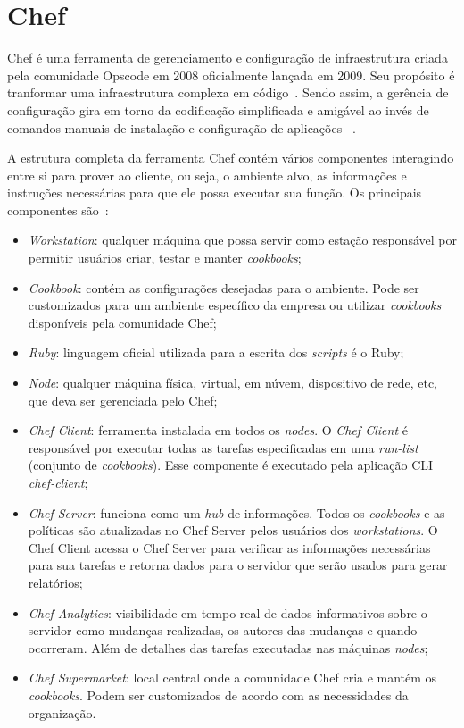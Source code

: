 \section{Chef}
\label{sec:chef}

Chef é uma ferramenta de gerenciamento e configuração de infraestrutura criada
pela comunidade Opscode em 2008 oficialmente lançada em 2009. Seu propósito é
tranformar uma infraestrutura complexa em código~\cite{chef:2016}. Sendo assim, a gerência de
configuração gira em torno da codificação simplificada e amigável
ao invés de comandos manuais de instalação e configuração de aplicações ~\cite{sharma:2015}.

A estrutura completa da ferramenta Chef contém vários componentes interagindo entre si para
prover ao cliente, ou seja, o ambiente alvo, as informações e instruções necessárias para que ele
possa executar sua função. Os principais componentes são~\cite{chefdoc:2016}:

\begin{itemize}
  \item \textit{Workstation}: qualquer máquina que possa servir como estação
    responsável por permitir usuários criar, testar e manter \textit{cookbooks};
  \item \textit{Cookbook}: contém as configurações desejadas para o ambiente.
    Pode ser customizados para um ambiente específico da empresa ou utilizar
    \textit{cookbooks} disponíveis pela comunidade Chef;
  \item \textit{Ruby}: linguagem oficial utilizada para a escrita dos \textit{scripts}
    é o Ruby;
  \item \textit{Node}: qualquer máquina física, virtual, em núvem, dispositivo
    de rede, etc, que deva ser gerenciada pelo Chef;
  \item \textit{Chef Client}: ferramenta instalada em todos os \textit{nodes}. O
    \textit{Chef Client} é responsável por executar todas as tarefas especificadas
    em uma \textit{run-list} (conjunto de \textit{cookbooks}). Esse componente é
    executado pela aplicação CLI \textit{chef-client};
  \item \textit{Chef Server}: funciona como um \textit{hub} de informações. Todos os
    \textit{cookbooks} e as políticas são atualizadas no Chef Server pelos usuários
    dos \textit{workstations}. O Chef Client acessa o Chef Server para verificar
    as informações necessárias para sua tarefas e retorna dados para o servidor
    que serão usados para gerar relatórios;
  \item \textit{Chef Analytics}: visibilidade em tempo real de dados informativos
    sobre o servidor como mudanças realizadas, os autores das mudanças e quando
    ocorreram. Além de detalhes das tarefas executadas nas máquinas \textit{nodes};
  \item \textit{Chef Supermarket}: local central onde a comunidade Chef cria e
    mantém os \textit{cookbooks}. Podem ser customizados de acordo com as necessidades
    da organização.
\end{itemize}

